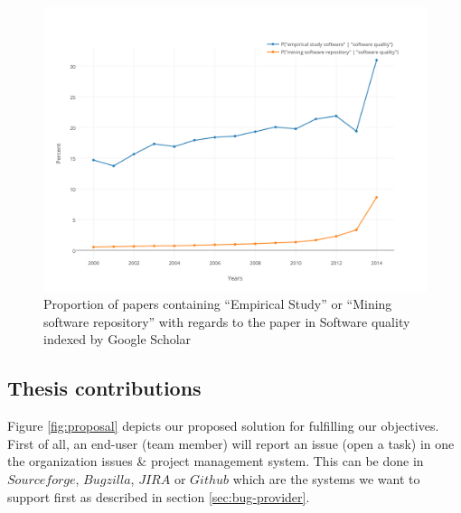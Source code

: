 \begin{itemize}
	\begin{figure}[h!]
	  \centering
	  	    \includegraphics[scale=0.7]{media/scholar.png}
	    \caption{Proportion of papers containing ``Empirical Study'' or ``Mining software repository'' with regards to the paper in Software quality indexed by Google Scholar	\label{fig:scholar}}
	\end{figure}

\end{itemize}

\subsection{Thesis contributions\label{sec:objective-thesis}}

Figure \ref{fig:proposal} depicts our proposed solution for fulfilling our objectives.
First of all, an end-user (team member) will report an issue (open a task) in one the organization issues \& project management system. This can be done in $Sourceforge$, $Bugzilla$, $JIRA$ or $Github$ which are the systems we want to support first as described in section \ref{sec:bug-provider}.

